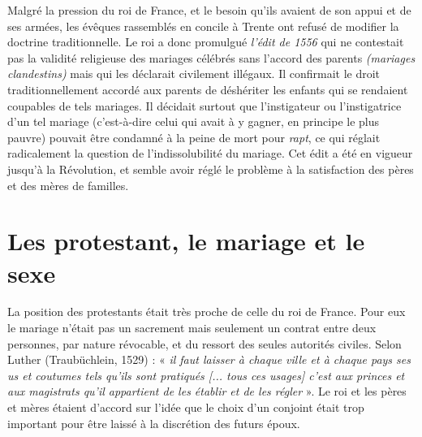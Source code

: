  Malgré la pression du roi de France, et le besoin qu'ils avaient de son appui et de ses armées, les évêques rassemblés en concile à Trente ont refusé de modifier la doctrine traditionnelle. Le roi a donc promulgué \emph{l'édit de 1556} qui ne contestait pas la validité religieuse des mariages célébrés sans l'accord des parents \emph{(mariages clandestins)} mais qui les déclarait civilement illégaux. Il confirmait le droit traditionnellement accordé aux parents de déshériter les enfants qui se rendaient coupables de tels mariages. Il décidait surtout que l'instigateur ou l'instigatrice d'un tel mariage (c'est-à-dire celui qui avait à y gagner, en principe le plus pauvre) pouvait être condamné à la peine de mort pour \emph{rapt}, ce qui réglait radicalement la question de l'indissolubilité du mariage. Cet édit a été en vigueur jusqu'à la Révolution, et semble avoir réglé le problème à la satisfaction des pères et des mères de familles. 
 
 \section{Les protestant, le mariage et le sexe}

 La position des protestants était très proche de celle du roi de France. Pour eux le mariage n'était pas un sacrement mais seulement un contrat entre deux personnes, par nature révocable, et du ressort des seules autorités civiles. Selon Luther (Traubüchlein, 1529) : « \emph{il faut laisser à chaque ville et à chaque pays ses us et coutumes tels qu'ils sont pratiqués \emph{[... tous ces usages]} c'est aux princes et aux magistrats qu'il appartient de les établir et de les régler} ». Le roi et les pères et mères étaient d'accord sur l'idée que le choix d'un conjoint était trop important pour être laissé à la discrétion des futurs époux.
 

